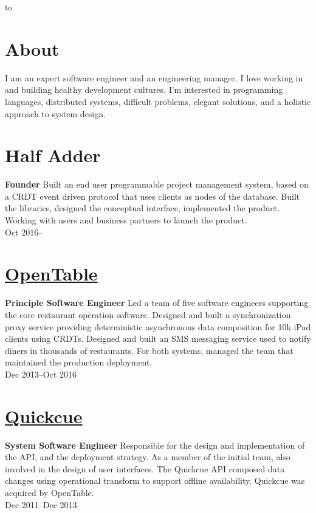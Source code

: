 \documentclass[margin]{res}
\begin{document}

\hbox to 

\begin{resume}
\section{About}

I am an expert software engineer and an engineering manager. I love
working in and building healthy development cultures. I'm interested
in programming languages, distributed systems, difficult problems,
elegant solutions, and a holistic approach to system design.

\section{Half Adder}
{\bf Founder}
%
Built an end user programmable project management system, based on a
CRDT event driven protocol that uses clients as nodes of the database.
Built the libraries, designed the conceptual interface, implemented
the product. Working with users and business partners to launch the
product.\\
%
Oct 2016--

\section{\href{https://opentable.com/}{OpenTable}}
{\bf Principle Software Engineer}
%
Led a team of five software engineers supporting the core restaurant
operation software. Designed and built a synchronization proxy service
providing deterministic asynchronous data composition for 10k iPad
clients using CRDTs. Designed and built an SMS messaging service used
to notify diners in thousands of restaurants. For both systems,
managed the team that maintained the production deployment.\\
%
Dec 2013--Oct 2016

\section{\href{https://quickcue.com/}{Quickcue}}
{\bf System Software Engineer}
%
Responsible for the design and implementation of the API, and the
deployment strategy. As a member of the initial team, also involved in
the design of user interfaces. The Quickcue API composed data changes
using operational transform to support offline availability. Quickcue
was acquired by OpenTable.\\
%
Dec 2011--Dec 2013


\end{resume}
\end{document}
